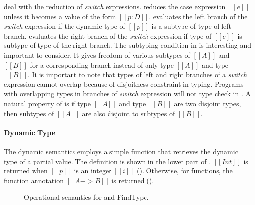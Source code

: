  deal with the reduction
of \emph{switch} expressions.
 reduces the case expression $[[e]]$ unless it
becomes a value of the form $[[p:D]]$.   evaluates
the left branch of the \emph{switch} expression if the dynamic type of $[[p]]$ is
a subtype of type of left branch.   evaluates the right
branch of the \emph{switch} expression if type of $[[e]]$ is subtype
of type of the right branch. The subtyping condition in  is interesting and important to consider. It gives 
freedom of various subtypes of $[[A]]$ and $[[B]]$ for a corresponding
branch instead of only type $[[A]]$ and type $[[B]]$. It is important
to note that types of left and right branches of a \emph{switch}
expression cannot overlap because of disjoitness constraint in
typing. Programs with overlapping types in branches of \emph{switch}
expression will not type check in \cal.
A natural property of \cal is
if type $[[A]]$ and type $[[B]]$ are two disjoint types, then subtypes
of $[[A]]$ are also disjoint to subtypes of $[[B]]$.


\paragraph{Dynamic Type} The dynamic semantics employs a simple
function that retrieves the dynamic type of a partial value. The definition
is shown in the lower part of .
$[[Int]]$ is returned when $[[p]]$ is an integer $[[i]]$ ().
Otherwise, for functions, the function annotation $[[A -> B]]$ is returned
().

\begin{figure}[t]
  \begin{small}
    \centering
  \end{small}
  \begin{small}
    \centering
  \end{small}
  \caption{Operational semantics for \cal and FindType.}
  \label{fig:union:os}
\end{figure}

